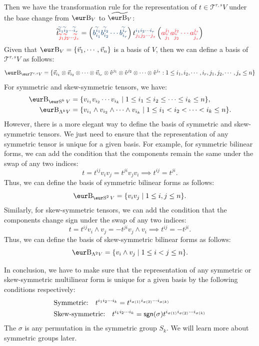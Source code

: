Then we have the transformation rule for the representation of $t \in \mathcal{T}^{r, s} V$ under the base change from $\B_V$ to $\widetilde{\B_V}$:
\[
	\widetilde{t}^{{\color{ustblue} \widetilde{i}_1 \widetilde{i}_2 \cdots \widetilde{i}_r}}_{{\color{red} \widetilde{j}_1 \widetilde{j}_2 \cdots \widetilde{j}_s}} = \left({\color{ustblue} b_{i_1}^{\widetilde{i}_1} b_{i_2}^{\widetilde{i}_2} \cdots b_{i_r}^{\widetilde{i}_r}}\right) t^{{\color{ustblue} i_1 i_2 \cdots i_r}}_{{\color{ustred} j_1 j_2 \cdots j_s}} \left({\color{ustred} a^{j_1}_{\widetilde{j}_1} a^{j_2}_{\widetilde{j}_2} \cdots a^{j_s}_{\widetilde{j}_s}}\right)
\]
Given that $\B_V = \{ \vec{v}_1, \cdots, \vec{v}_n \}$ is a basis of $V$, then we can define a basis of $\mathcal{T}^{r, s} V$ as follows:
\[
	\B_{\mathcal{T}^{r, s} V} = \{ \vec{v}_{i_1} \otimes \vec{v}_{i_2} \otimes \cdots \otimes \vec{v}_{i_r} \otimes \hat{v}^{j_1} \otimes \hat{v}^{j_2} \otimes \cdots \otimes \hat{v}^{j_s} : 1 \leq i_1, i_2, \cdots, i_r, j_1, j_2, \cdots, j_s \leq n \}
\]
For symmetric and skew-symmetric tensors, we have:
\begin{align*}
	\B_{\Sy^k V}     & = \{ v_{i_1} v_{i_2} \cdots v_{i_k} \mid 1 \leq i_1 \leq i_2 \leq \cdots \leq i_k \leq n \},             \\
	\B_{\Lambda^k V} & = \{ v_{i_1} \wedge v_{i_2} \wedge \cdots \wedge v_{i_k} \mid 1 \leq i_1 < i_2 < \cdots < i_k \leq n \}.
\end{align*}
However, there is a more elegant way to define the basis of symmetric and skew-symmetric tensors. We just need to ensure that the representation of any symmetric tensor is unique for a given basis. For example, for symmetric bilinear forms, we can add the condition that the components remain the same under the swap of any two indices:
\[
	t = t^{ij} v_i v_j = t^{ji} v_j v_i \implies t^{ij} = t^{ji}.
\]
Thus, we can define the basis of symmetric bilinear forms as follows:
\[
	\B_{\Sy^2 V} = \{ v_i v_j \mid 1 \leq i, j \leq n \}.
\]
Similarly, for skew-symmetric tensors, we can add the condition that the components change sign under the swap of any two indices:
\[
	t = t^{ij} v_i \wedge v_j = -t^{ji} v_j \wedge v_i \implies t^{ij} = -t^{ji}.
\]
Thus, we can define the basis of skew-symmetric bilinear forms as follows:
\[
	\B_{\Lambda^2 V} = \{ v_i \wedge v_j \mid 1 \leq i < j \leq n \}.
\]

In conclusion, we have to make sure that the representation of any symmetric or skew-symmetric multilinear form is unique for a given basis by the following conditions respectively:
\begin{align*}
	 & \text{Symmetric:} \quad t^{i_1 i_2 \cdots i_k} = t^{i_{\sigma(1)} i_{\sigma(2)} \cdots i_{\sigma(k)}}                   \\
	 & \text{Skew-symmetric:} \quad t^{i_1 i_2 \cdots i_k} = \operatorname{\text{\normalfont\sffamily sgn}}(\sigma) t^{i_{\sigma(1)} i_{\sigma(2)} \cdots i_{\sigma(k)}}
\end{align*}
The $\sigma$ is any permutation in the symmetric group $S_k$. We will learn more about symmetric groups later.

